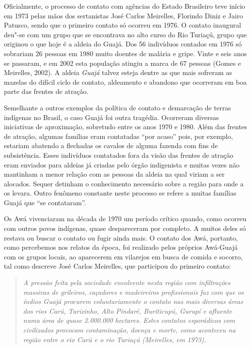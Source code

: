 Oficialmente, o processo de contato com agências do Estado Brasileiro
teve início em 1973 pelas mãos dos sertanistas José Carlos Meirelles,
Florindo Diniz e Jairo Patusco, sendo que o primeiro contato só ocorreu
em 1976. O contato inaugural deu"-se com um grupo que se encontrava no
alto curso do Rio Turiaçú, grupo que originou o que hoje é a aldeia do
 Guajá. Dos 56 indivíduos contados em 1976 só sobrariam 26 pessoas em
1980 muito doentes de malária e gripe. Vinte e seis anos se passaram, e
em 2002 esta população atingiu a marca de 67 pessoas (Gomes e Meirelles,
2002). A aldeia \emph{Guajá} talvez esteja dentre as que mais sofreram
as mazelas do difícil ciclo de contato, aldeamento e abandono que
ocorreram em boa parte das frentes de atração.

Semelhante a outros exemplos da política de contato e demarcação de
terras indígenas no Brasil, o caso Guajá foi outra tragédia. Ocorreram
diversas iniciativas de aproximação, sobretudo entre os anos 1970 e
1980. Além das frentes de atração, algumas famílias eram contatadas
``por acaso'' pois, por exemplo, estariam abatendo a flechadas os
cavalos de alguma fazenda com fins de subsistência. Esses indivíduos
contatados fora da visão das frentes de atração eram enviados para
aldeias já criadas pelo órgão indigenista e muitas vezes não mantinham a
menor relação com as pessoas da aldeia na qual viriam a ser alocados.
Sequer detinham o conhecimento necessário sobre a região para onde a
 os levara. Outro fenômeno constante neste processo se refere a
muitas famílias Guajá que ``se contataram''.

Os Awá vivenciaram na década de 1970 um período crítico quando, como
ocorreu com outros povos indígenas, quase despareceram por completo. A
muitos deles só restava ou buscar o contato ou fugir ainda mais. O
contato dos Awá, portanto, como percebemos nos relatos da época, foi
realizado pelos próprios Awá-Guajá com os grupos locais, ao aparecerem
em vilarejos em busca de comida e socorro, tal como descreve José Carlos
Meirelles, que participou do primeiro contato:

\begin{quote}
\emph{A pressão feita pela sociedade envolvente nesta região com infiltrações
massivas de grileiros, caçadores e madeireiros profissionais faz com que
os índios Guajá procurem voluntariamente o contato nas mais diversas
áreas dos rios Carú, Turizinho, Alto Pindaré, Buriticupú, Gurupí e
afluente numa área de quase 2.000.000 hectares. Estes contatos
esporádicos com civilizados provocam contaminação, doença e morte, como
aconteceu na região entre o rio Carú e o rio Turiaçú (Meirelles, em
1973).}
\end{quote}

